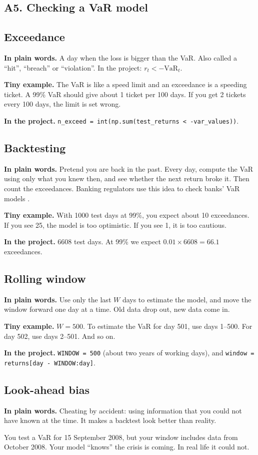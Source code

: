 \documentclass[11pt,a4paper]{article}
\newcommand{\term}[1]{\subsection{#1}}
\newcommand{\plain}{\textbf{In plain words.} }
\newcommand{\inproj}{\textbf{In the project.} }
\newcommand{\tinyex}{\textbf{Tiny example.} }
\newcommand{\code}[1]{\texttt{#1}}
\begin{document}
\subsection*{A5. Checking a VaR model}

\term{Exceedance}\label{g:exceed}
\plain A day when the loss is bigger than the VaR. Also called a ``hit'',
``breach'' or ``violation''. In the project: $r_t < -\text{VaR}_t$.

\tinyex The VaR is like a speed limit and an exceedance is a speeding ticket.
A 99\% VaR should give about 1 ticket per 100 days. If you get 2 tickets
every 100 days, the limit is set wrong.

\inproj \code{n\_exceed = int(np.sum(test\_returns < -var\_values))}.

\term{Backtesting}\label{g:backtest}
\plain Pretend you are back in the past. Every day, compute the VaR using
only what you knew then, and see whether the next return broke it. Then
count the exceedances. Banking regulators use this idea to check banks'
VaR models \citep{basel1996backtesting}.

\tinyex With 1000 test days at 99\%, you expect about 10 exceedances. If you
see 25, the model is too optimistic. If you see 1, it is too cautious.

\inproj 6608 test days. At 99\% we expect $0.01 \times 6608 = 66.1$
exceedances.

\term{Rolling window}\label{g:window}
\plain Use only the last $W$ days to estimate the model, and move the window
forward one day at a time. Old data drop out, new data come in.

\tinyex $W=500$. To estimate the VaR for day 501, use days 1--500. For day
502, use days 2--501. And so on.

\inproj \code{WINDOW = 500} (about two years of working days), and
\code{window = returns[day - WINDOW:day]}.

\term{Look-ahead bias}\label{g:lookahead}
\plain Cheating by accident: using information that you could not have known
at the time. It makes a backtest look better than reality.

\begin{example}
You test a VaR for 15 September 2008, but your window includes data from
October 2008. Your model ``knows'' the crisis is coming. In real life it
could not.
\end{example}
\end{document}
